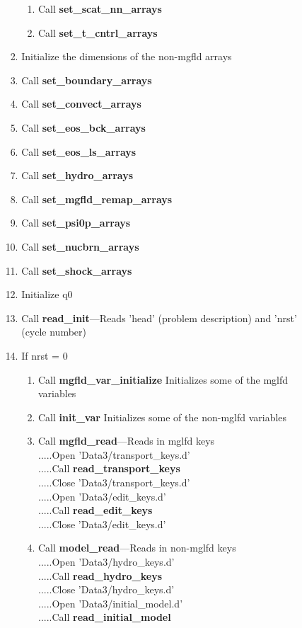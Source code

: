 \documentclass[11pt,doublespace]{article}
\begin{document}
\begin{itemize}
\begin{enumerate}
\begin{enumerate}
\begin{enumerate}
\begin{enumerate}
  \item Call {\bf set\_scat\_nn\_arrays}
  \item Call {\bf set\_t\_cntrl\_arrays}
\end{enumerate}
  \item Initialize the dimensions of the non-mgfld arrays
  \item Call {\bf set\_boundary\_arrays}
  \item Call {\bf set\_convect\_arrays}
  \item Call {\bf set\_eos\_bck\_arrays}
  \item Call {\bf set\_eos\_ls\_arrays}
  \item Call {\bf set\_hydro\_arrays}
  \item Call {\bf set\_mgfld\_remap\_arrays}
  \item Call {\bf set\_psi0p\_arrays}
  \item Call {\bf set\_nucbrn\_arrays}
  \item Call {\bf set\_shock\_arrays}
  \item Initialize q0
  \item Call {\bf read\_init}---Reads 'head' (problem description) and 'nrst' (cycle number)
  \item If nrst = 0
 \begin{enumerate}
  \item Call {\bf mgfld\_var\_initialize} Initializes some of the mglfd variables
  \item Call {\bf init\_var} Initializes some of the non-mglfd variables
  \item Call {\bf mgfld\_read}---Reads in mglfd keys\\
.....Open 'Data3/transport\_keys.d'\\
.....Call {\bf read\_transport\_keys}\\
.....Close 'Data3/transport\_keys.d'\\
.....Open 'Data3/edit\_keys.d'\\
.....Call {\bf read\_edit\_keys}\\
.....Close 'Data3/edit\_keys.d'
  \item Call {\bf model\_read}---Reads in non-mglfd keys\\
.....Open 'Data3/hydro\_keys.d'\\
.....Call {\bf read\_hydro\_keys}\\
.....Close 'Data3/hydro\_keys.d'\\
.....Open 'Data3/initial\_model.d'\\
.....Call {\bf read\_initial\_model}\\

\end{enumerate}
\end{enumerate}
\end{enumerate}
\end{enumerate}
\end{itemize}
\end{document}
